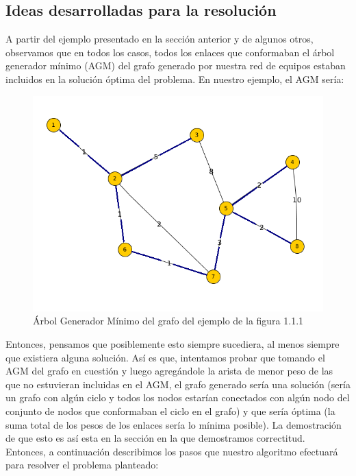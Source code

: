 \documentclass[11pt, a4paper, twoside]{article}
\begin{document}
\subsection{Ideas desarrolladas para la resolución}
A partir del ejemplo presentado en la sección anterior y de algunos otros,
observamos que en todos los casos, todos los enlaces que conformaban el 
árbol generador mínimo (AGM) del grafo generado por nuestra red de equipos
estaban incluidos en la solución óptima del problema. En nuestro ejemplo,
el AGM sería:

\begin{figure}[H]
\centering
\includegraphics[scale=1]{imagenes/equipos6.png}
\caption{Árbol Generador Mínimo del grafo del ejemplo de la figura 1.1.1}
\end{figure} 

Entonces, pensamos que posiblemente esto siempre sucediera, al menos siempre
que existiera alguna solución. Así es que,
intentamos probar que tomando el AGM del grafo en cuestión y luego 
agregándole la arista de menor peso de las que no estuvieran incluidas
en el AGM, el grafo generado sería una solución (sería un grafo con algún 
ciclo y todos los nodos estarían conectados con algún nodo del conjunto de 
nodos que conformaban el ciclo en el grafo) y que sería óptima (la suma
total de los pesos de los enlaces sería lo mínima posible). La demostración
de que esto es así esta en la sección en la que demostramos correctitud. \\
Entonces, a continuación describimos los pasos que nuestro algoritmo
efectuará para resolver el problema planteado:
\end{document}
